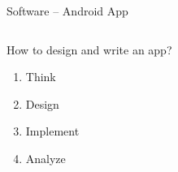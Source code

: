 \documentclass{beamer}
\begin{document}
	\begin{frame}{Software -- Android App}
		\begin{columns}
				\begin{alertblock}{How to design and write an app?}
					\begin{enumerate}
						\item \alert<2>{Think}
						\item \alert<3>{Design}
						\item \alert<4>{Implement}
						\item \alert<5>{Analyze}
					\end{enumerate}
				\end{alertblock}
\end{columns}
\end{frame}
\end{document}

